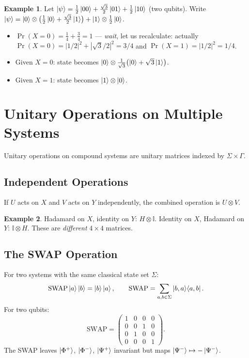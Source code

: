 \documentclass[11pt]{article}
\theoremstyle{definition}
\newtheorem{example}{Example}[section]
\begin{document}
\begin{example}
Let $\ket{\psi}=\frac{1}{2}\ket{00}+\frac{\sqrt{3}}{2}\ket{01}+\frac{1}{2}\ket{10}$ (two qubits).  
Write $\ket{\psi}=\ket{0}\otimes\bigl(\frac{1}{2}\ket{0}+\frac{\sqrt{3}}{2}\ket{1}\bigr)+\ket{1}\otimes\frac{1}{2}\ket{0}$.

\begin{itemize}
    \item $\Pr(X=0)=\frac{1}{4}+\frac{3}{4}=1$ --- \emph{wait}, let us recalculate: actually $\Pr(X=0)=|1/2|^2+|\sqrt{3}/2|^2 = 3/4$ and $\Pr(X=1)=|1/2|^2=1/4$.
    \item Given $X=0$: state becomes $\ket{0}\otimes\frac{1}{\sqrt{3}}\bigl(\ket{0}+\sqrt{3}\ket{1}\bigr)$.
    \item Given $X=1$: state becomes $\ket{1}\otimes\ket{0}$.
\end{itemize}
\end{example}

\section{Unitary Operations on Multiple Systems}

Unitary operations on compound systems are unitary matrices indexed by $\Sigma\times\Gamma$.

\subsection{Independent Operations}

If $U$ acts on $X$ and $V$ acts on $Y$ independently, the combined operation is $U\otimes V$.

\begin{example}
Hadamard on $X$, identity on $Y$: $H\otimes\mathbb{I}$.  Identity on $X$, Hadamard on $Y$: $\mathbb{I}\otimes H$.  These are \emph{different} $4\times 4$ matrices.
\end{example}

\subsection{The SWAP Operation}

For two systems with the same classical state set $\Sigma$:
\[
    \mathrm{SWAP}\ket{a}\ket{b} = \ket{b}\ket{a},
    \qquad
    \mathrm{SWAP} = \sum_{a,b\in\Sigma}\ket{b,a}\!\bra{a,b}.
\]
For two qubits:
\[
    \mathrm{SWAP} = \begin{pmatrix}1&0&0&0\\0&0&1&0\\0&1&0&0\\0&0&0&1\end{pmatrix}.
\]
The SWAP leaves $\ket{\Phi^+}$, $\ket{\Phi^-}$, $\ket{\Psi^+}$ invariant but maps $\ket{\Psi^-}\mapsto -\ket{\Psi^-}$.
\end{document}
